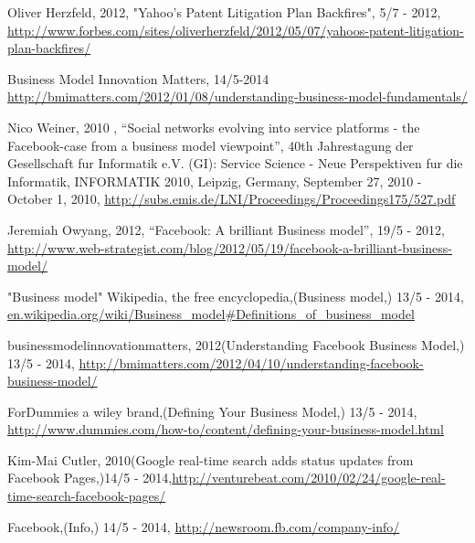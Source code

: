 \documentclass[conference]{IEEEtran}
\begin{document}
\begin{thebibliography}{1}
Oliver Herzfeld, 2012, "Yahoo's Patent Litigation Plan Backfires", 5/7 - 2012, \url{http://www.forbes.com/sites/oliverherzfeld/2012/05/07/yahoos-patent-litigation-plan-backfires/}


Business Model Innovation Matters,
14/5-2014
\href{http://bmimatters.com/2012/01/08/understanding-business-model-fundamentals/}{http://bmimatters.com/2012/01/08/understanding-business-model-fundamentals/}

Nico Weiner, 2010 , “Social networks evolving into service platforms - the
Facebook-case from a business model viewpoint”, 40th Jahrestagung der
Gesellschaft fur Informatik e.V. (GI): Service Science - Neue Perspektiven fur
die Informatik, INFORMATIK 2010, Leipzig, Germany, September 27, 2010 - October
1, 2010, \href{http://subs.emis.de/LNI/Proceedings/Proceedings175/527.pdf}{http://subs.emis.de/LNI/Proceedings/Proceedings175/527.pdf}

Jeremiah Owyang, 2012, “Facebook: A brilliant Business model”, 19/5 - 2012,
\href{http://www.web-strategist.com/blog/2012/05/19/facebook-a-brilliant-business-model/}{http://www.web-strategist.com/blog/2012/05/19/facebook-a-brilliant-business-model/}

"Business model"
Wikipedia, the free encyclopedia,(Business model,) 13/5 - 2014, \href{en.wikipedia.org/wiki/Business\_model\#Definitions\_of\_business\_model}{en.wikipedia.org/wiki/Business\_model\#Definitions\_of\_business\_model}

businessmodelinnovationmatters,
2012(Understanding Facebook Business Model,) 13/5 - 2014, \href{http://bmimatters.com/2012/04/10/understanding-facebook-business-model/}{http://bmimatters.com/2012/04/10/understanding-facebook-business-model/}

ForDummies a wiley brand,(Defining Your Business Model,) 13/5 - 2014, \href{http://www.dummies.com/how-to/content/defining-your-business-model.html}{http://www.dummies.com/how-to/content/defining-your-business-model.html}

Kim-Mai Cutler,
2010(Google real-time search adds status updates from Facebook Pages,)14/5 - 2014,\href{http://venturebeat.com/2010/02/24/google-real-time-search-facebook-pages/}{http://venturebeat.com/2010/02/24/google-real-time-search-facebook-pages/}

Facebook,(Info,) 14/5 - 2014, \href{http://newsroom.fb.com/company-info/}{http://newsroom.fb.com/company-info/}


\end{thebibliography}
\end{document}
